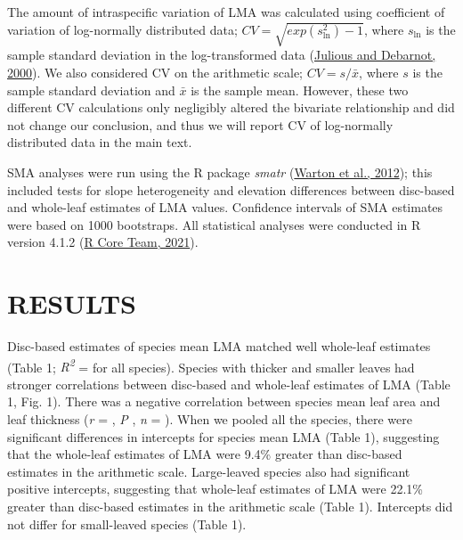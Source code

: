\documentclass[
  12pt,
  a4paper,
,tablecaptionabove
]{scrartcl}
\begin{document}
The amount of intraspecific variation of LMA was calculated using
coefficient of variation of log-normally distributed data;
\(CV = \sqrt{exp(s_{\mathrm{ln}}^2) - 1}\), where \(s_{\mathrm{ln}}\) is
the sample standard deviation in the log-transformed data
(\protect\hyperlink{ref-Julious2000}{Julious and Debarnot, 2000}). We
also considered CV on the arithmetic scale; \(CV = s/\bar{x}\), where
\(s\) is the sample standard deviation and \(\bar{x}\) is the sample
mean. However, these two different CV calculations only negligibly
altered the bivariate relationship and did not change our conclusion,
and thus we will report CV of log-normally distributed data in the main
text.

SMA analyses were run using the R package \emph{smatr}
(\protect\hyperlink{ref-Warton2012a}{Warton et al., 2012}); this
included tests for slope heterogeneity and elevation differences between
disc-based and whole-leaf estimates of LMA values. Confidence intervals
of SMA estimates were based on 1000 bootstraps. All statistical analyses
were conducted in R version 4.1.2
(\protect\hyperlink{ref-RCoreTeam2021}{R Core Team, 2021}).

\hypertarget{results}{%
\section{RESULTS}\label{results}}

Disc-based estimates of species mean LMA matched well whole-leaf
estimates (Table 1; \emph{R\textsuperscript{2}} = for all species).
Species with thicker and smaller leaves had stronger correlations
between disc-based and whole-leaf estimates of LMA (Table 1, Fig. 1).
There was a negative correlation between species mean leaf area and leaf
thickness (\emph{r} = , \emph{P} , \emph{n} = ). When we pooled all the
species, there were significant differences in intercepts for species
mean LMA (Table 1), suggesting that the whole-leaf estimates of LMA were
9.4\% greater than disc-based estimates in the arithmetic scale.
Large-leaved species also had significant positive intercepts,
suggesting that whole-leaf estimates of LMA were 22.1\% greater than
disc-based estimates in the arithmetic scale (Table 1). Intercepts did
not differ for small-leaved species (Table 1).
\end{document}
